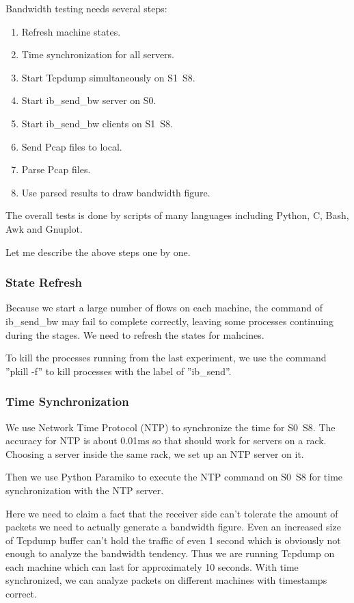 \documentclass[12pt,a4paper]{article}
\begin{document}
Bandwidth testing needs several steps:
\begin{enumerate}
	\item Refresh machine states.
	\item Time synchronization for all servers.
	\item Start Tcpdump simultaneously on S1~S8.
	\item Start ib\_send\_bw server on S0.
	\item Start ib\_send\_bw clients on S1~S8.
	\item Send Pcap files to local.
	\item Parse Pcap files.
	\item Use parsed results to draw bandwidth figure.
\end{enumerate}

The overall tests is done by scripts of many languages including Python, C, Bash, Awk and Gnuplot.

Let me describe the above steps one by one.

\subsubsection{State Refresh}

Because we start a large number of flows on each machine, the command of ib\_send\_bw may fail to complete correctly, leaving
some processes continuing during the stages. We need to refresh the states for mahcines.

To kill the processes running from the last experiment, we use the command ''pkill -f'' to kill processes with the label of ''ib\_send''.

\subsubsection{Time Synchronization}
We use Network Time Protocol (NTP) to synchronize the time for S0~S8.
The accuracy for NTP is about 0.01ms so that should work for servers on a rack.
Choosing a server inside the same rack, we set up an NTP server on it.

Then we use Python Paramiko to execute the NTP command on S0~S8 for time synchronization with the NTP server.

Here we need to claim a fact that the receiver side can't tolerate the amount of packets we need to actually generate a bandwidth figure.
Even an increased size of Tcpdump buffer can't hold the traffic of even 1 second which is obviously not enough to analyze the bandwidth tendency.
Thus we are running Tcpdump on each machine which can last for approximately 10 seconds.
With time synchronized, we can analyze packets on different machines with timestamps correct.
\end{document}
